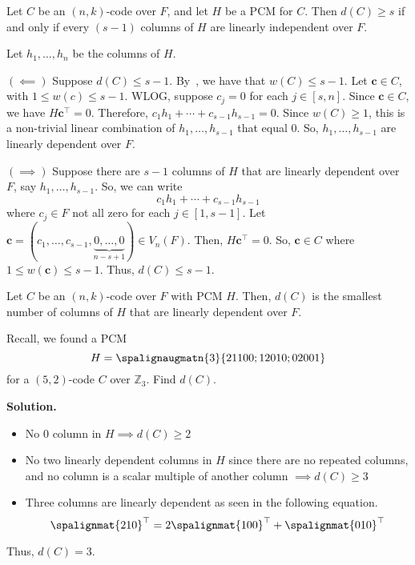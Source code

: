 
\begin{Theorem}{}{}
    Let $ C $ be an $ (n,k) $-code over $ F $, and let $ H $ be a PCM
    for $ C $. Then $ d(C)\geqslant s $ if and only if every $ (s-1) $ columns
    of $ H $ are linearly independent over $ F $.
\end{Theorem}

\begin{Proof}{}{}
    Let $ h_1,\ldots ,h_n $ be the columns of $ H $.

    $ (\impliedby) $ Suppose $ d(C)\leqslant s-1 $. By~,
    we have that $ w(C)\leqslant s-1 $.
    Let $ \symbf{c}\in C $, with $ 1\leqslant w(c)\leqslant s-1 $. WLOG, suppose
    $ c_j=0 $ for each $ j\in[s,n] $. Since $ \symbf{c}\in C $,
    we have $ H\symbf{c}^{\top}=0 $. Therefore,
    $ c_1h_1+\cdots+c_{s-1}h_{s-1}=0 $.
    Since $ w(C)\geqslant 1 $, this is a non-trivial linear combination
    of $ h_1,\ldots ,h_{s-1} $ that equal $ 0 $. So,
    $ h_1,\ldots ,h_{s-1} $ are linearly dependent over $ F $.

    $ (\implies) $ Suppose there are $ s-1 $ columns of $ H $ that
    are linearly dependent over $ F $, say $ h_1,\ldots ,h_{s-1} $. So,
    we can write
    \[ c_1h_1+\cdots+c_{s-1}h_{s-1} \]
    where $ c_j\in F $ not all zero for each $ j\in[1,s-1] $.
    Let $ \symbf{c}=(c_1,\ldots ,c_{s-1},
        \underbrace{0,\ldots,0}_{n-s+1})\in V_n(F) $. Then,
    $ H\symbf{c}^{\top}=0 $. So, $ \symbf{c}\in C $ where $ 1\leqslant w(\symbf{c})\leqslant s-1 $.
    Thus, $ d(C)\leqslant s-1 $.
\end{Proof}

\begin{Corollary}{}{}
    Let $ C $ be an $ (n,k) $-code over $ F $ with PCM $ H $. Then,
    $ d(C) $ is the smallest number of columns of $ H $ that
    are linearly dependent over $ F $.
\end{Corollary}

\begin{Example}{}{}
    Recall, we found a PCM
    \[ H=\spalignaugmatn{3}{
            2 1 1 0 0;
            1 2 0 1 0;
            0 2 0 0 1} \]
    for a $ (5,2) $-code $ C $ over $ \mathbb{Z}_3 $. Find $ d(C) $.

    \textbf{Solution.}
    \begin{itemize}
        \item No $ 0 $ column in $ H\implies d(C)\geqslant 2 $
        \item No two linearly dependent columns in $ H $ since there are
              no repeated columns, and no column is a scalar multiple of another
              column $ \implies d(C)\geqslant 3 $
        \item Three columns are linearly dependent as seen in the following equation.
              \[ \spalignmat{2 1 0}^\top=2\spalignmat{1 0 0}^\top+\spalignmat{0 1 0}^\top \]
    \end{itemize}
    Thus, $ d(C)=3 $.
\end{Example}

